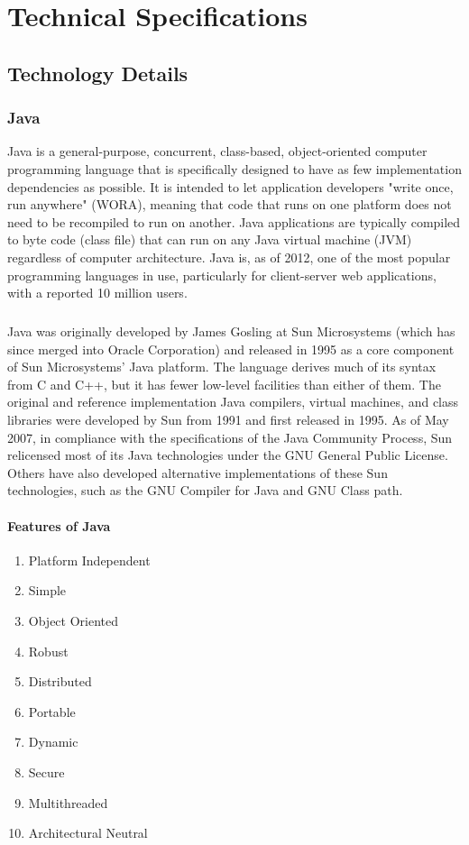 \chapter{Technical Specifications}
\section{Technology Details}
\subsection{Java}
Java is a general-purpose, concurrent, class-based, object-oriented computer programming language that is specifically designed to have as few implementation dependencies as possible. It is intended to let application developers "write once, run anywhere" (WORA), meaning that code that runs on one platform does not need to be recompiled to run on another. Java applications are typically compiled to byte code (class file) that can run on any Java virtual machine (JVM) regardless of computer architecture. Java is, as of 2012, one of the most popular programming languages in use, particularly for client-server web applications, with a reported 10 million users.
\paragraph{}
Java was originally developed by James Gosling at Sun Microsystems (which has since merged into Oracle Corporation) and released in 1995 as a core component of Sun Microsystems' Java platform. The language derives much of its syntax from C and C++, but it has fewer low-level facilities than either of them. The original and reference implementation Java compilers, virtual machines, and class libraries were developed by Sun from 1991 and first released in 1995. As of May 2007, in compliance with the specifications of the Java Community Process, Sun relicensed most of its Java technologies under the GNU General Public License. Others have also developed alternative implementations of these Sun technologies, such as the GNU Compiler for Java and GNU Class path.

\subsubsection{Features of Java}
\begin{enumerate}
\item Platform Independent
\item Simple
\item Object Oriented
\item Robust
\item Distributed
\item Portable
\item Dynamic
\item Secure
\item Multithreaded
\item Architectural Neutral
\end{enumerate}


